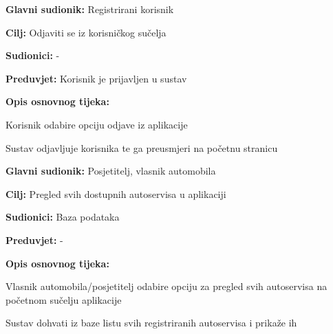 \noindent {}
\begin{packed_item}
	
	\item \textbf{Glavni sudionik: } Registrirani korisnik
	\item  \textbf{Cilj:} Odjaviti se iz korisničkog sučelja
	\item  \textbf{Sudionici:} -
	\item  \textbf{Preduvjet:} Korisnik je prijavljen u sustav
	\item  \textbf{Opis osnovnog tijeka:}
	
	\item[] \begin{packed_enum}
		
		\item Korisnik odabire opciju odjave iz aplikacije
		\item Sustav odjavljuje korisnika te ga preusmjeri na početnu stranicu
	\end{packed_enum}
	
\end{packed_item}

\noindent {}
\begin{packed_item}
	
	\item \textbf{Glavni sudionik: } Posjetitelj, vlasnik automobila
	\item  \textbf{Cilj:} Pregled svih dostupnih autoservisa u aplikaciji
	\item  \textbf{Sudionici:} Baza podataka
	\item  \textbf{Preduvjet:} -
	\item  \textbf{Opis osnovnog tijeka:}
	
	\item[] \begin{packed_enum}
		
		\item Vlasnik automobila/posjetitelj odabire opciju za pregled svih autoservisa na početnom sučelju aplikacije
		\item Sustav dohvati iz baze listu svih registriranih autoservisa i prikaže ih 
	\end{packed_enum}
	
\end{packed_item}

